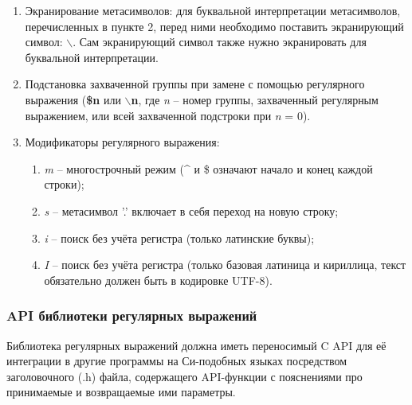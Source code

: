 \begin{enumerate}
\begin{enumerate}
		\item\verb`\w` – буква латинского алфавита, цифра или символ подчёркивания;
		\item\verb`\W` – любой символ, кроме буквенно-цифрового и знака подчёркивания;
		\item\verb`\a` – буква латинского алфавита;
		\item\verb`\A` – любой символ, кроме латинских букв;
		\item\verb`\p` – символы пунктуации;
		\item\verb`\P` – любой непунктуационный символ;
		\item\verb`\n` – символ новой строки;
		\item\verb`\t` – символ табуляции.
	\end{enumerate}
	\item Экранирование метасимволов: для буквальной интерпретации метасимволов, перечисленных в пункте 2, перед ними необходимо поставить экранирующий символ: $\backslash$. Сам экранирующий символ также нужно экранировать для буквальной интерпретации.
	\item Подстановка захваченной группы при замене с помощью регулярного выражения (\textbf{\$n} или \textbf{$\backslash$n}, где \textit{n} – номер группы, захваченный регулярным выражением, или всей захваченной подстроки при \textit{n} = 0).
	\item Модификаторы регулярного выражения:
	\begin{enumerate}
		\item\textit{m} – многострочный режим (\^{} и \$ означают начало и конец каждой строки);
		\item\textit{s} – метасимвол '.' включает в себя переход на новую строку;
		\item\textit{i} – поиск без учёта регистра (только латинские буквы);
		\item\textit{I} – поиск без учёта регистра (только базовая латиница и кириллица, текст обязательно должен быть в кодировке UTF-8).
	\end{enumerate}
\end{enumerate}

\subsubsection{API библиотеки регулярных выражений}

Библиотека регулярных выражений должна иметь переносимый C API для её интеграции в другие программы на Си-подобных языках посредством заголовочного (.h) файла, содержащего API-функции с пояснениями про принимаемые и возвращаемые ими параметры.

